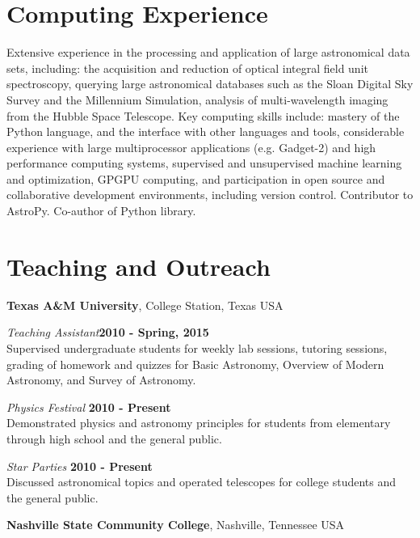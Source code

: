 \documentclass[margin,line, 11pt]{res}
\begin{document}
\begin{resume}
\section{\sc Computing Experience}
Extensive experience in the processing and application of large astronomical data sets, including: the acquisition and reduction of optical integral field unit spectroscopy, querying large astronomical databases such as the Sloan Digital Sky Survey and the Millennium Simulation, analysis of multi-wavelength imaging from the Hubble Space Telescope. Key computing skills include: mastery of the Python language, and the interface with other languages and tools, considerable experience with large multiprocessor applications (e.g. Gadget-2) and high performance computing systems, supervised and unsupervised machine learning and optimization, GPGPU computing, and participation in open source and collaborative development environments, including version control. Contributor to {\sc AstroPy}. Co-author of \href{http://astlib.sourceforge.net/}{} Python library.
\vspace*{-3mm}

\section{\sc Teaching and Outreach}
\textbf{Texas A\&M University}, College Station, Texas USA
\vspace{-3mm}

\emph{Teaching Assistant}\hfill \textbf{2010 - Spring, 2015}\\
Supervised undergraduate students for weekly lab sessions, tutoring sessions, grading of homework and quizzes for Basic Astronomy, Overview of Modern Astronomy, and Survey of Astronomy.
\vspace*{-3mm}

\emph{Physics Festival} \hfill \textbf{2010 - Present}\\
Demonstrated physics and astronomy principles for students from elementary through high school and the general public.
\vspace*{-3mm}

\emph{Star Parties} \hfill \textbf{2010 - Present}\\
Discussed astronomical topics and operated telescopes for college students and the general public.

\textbf{Nashville State Community College}, Nashville, Tennessee USA
\vspace{-3mm}


\end{resume}
\end{document}
